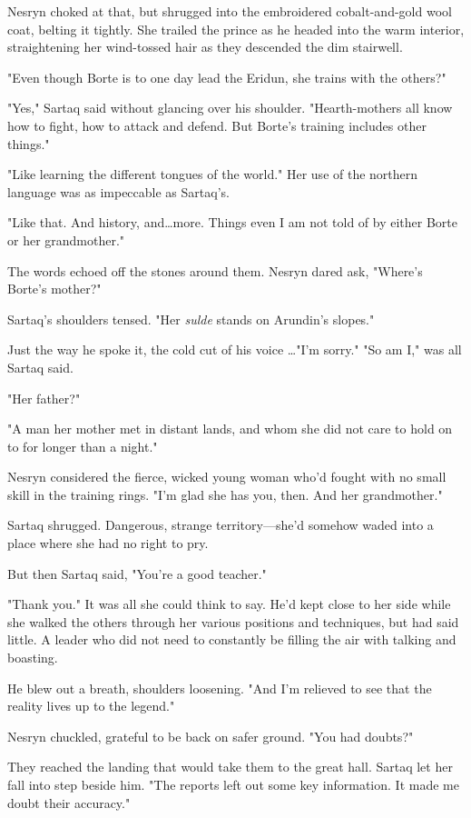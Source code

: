 Nesryn choked at that, but shrugged into the embroidered cobalt-and-gold wool coat, belting it tightly.
She trailed the prince as he headed into the warm interior, straightening her wind-tossed hair as they descended the dim stairwell.

"Even though Borte is to one day lead the Eridun, she trains with the others?"

"Yes," Sartaq said without glancing over his shoulder.
"Hearth-mothers all know how to fight, how to attack and defend.
But Borte's training includes other things."

"Like learning the different tongues of the world."
Her use of the northern language was as impeccable as Sartaq's.

"Like that.
And history, and\ldots more.
Things even I am not told of by either Borte or her grandmother."

The words echoed off the stones around them.
Nesryn dared ask, "Where's Borte's mother?"

Sartaq's shoulders tensed.
"Her \emph{sulde} stands on Arundin's slopes."

Just the way he spoke it, the cold cut of his voice \ldots"I'm sorry."
"So am I," was all Sartaq said.

"Her father?"

"A man her mother met in distant lands, and whom she did not care to hold on to for longer than a night."

Nesryn considered the fierce, wicked young woman who'd fought with no small skill in the training rings.
"I'm glad she has you, then.
And her grandmother."

Sartaq shrugged.
Dangerous, strange territory---she'd somehow waded into a place where she had no right to pry.

But then Sartaq said, "You're a good teacher."

"Thank you."
It was all she could think to say.
He'd kept close to her side while she walked the others through her various positions and techniques, but had said little.
A leader who did not need to constantly be filling the air with talking and boasting.

He blew out a breath, shoulders loosening.
"And I'm relieved to see that the reality lives up to the legend."

Nesryn chuckled, grateful to be back on safer ground.
"You had doubts?"

They reached the landing that would take them to the great hall.
Sartaq let her fall into step beside him.
"The reports left out some key information.
It made me doubt their accuracy."


